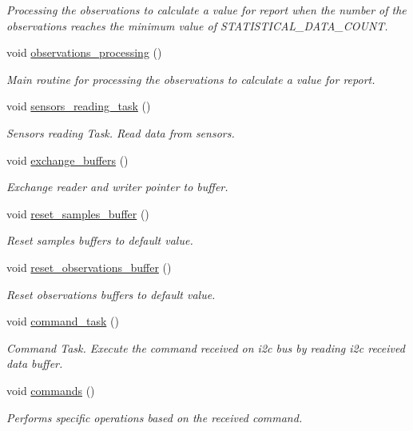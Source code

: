 \begin{DoxyCompactItemize}
\begin{DoxyCompactList}\small\item\em Processing the observations to calculate a value for report when the number of the observations reaches the minimum value of S\+T\+A\+T\+I\+S\+T\+I\+C\+A\+L\+\_\+\+D\+A\+T\+A\+\_\+\+C\+O\+U\+NT. \end{DoxyCompactList}\item 
void \hyperlink{i2c-th_8ino_a4c8e037e3b3f4c043abf3de8cf57fe68}{observations\+\_\+processing} ()
\begin{DoxyCompactList}\small\item\em Main routine for processing the observations to calculate a value for report. \end{DoxyCompactList}\item 
void \hyperlink{i2c-th_8ino_ad3efe51e17cb8205a24267c2992a12d4}{sensors\+\_\+reading\+\_\+task} ()
\begin{DoxyCompactList}\small\item\em Sensors reading Task. Read data from sensors. \end{DoxyCompactList}\item 
void \hyperlink{i2c-th_8ino_a46696a96b3118b5d8900703c054166c8}{exchange\+\_\+buffers} ()
\begin{DoxyCompactList}\small\item\em Exchange reader and writer pointer to buffer. \end{DoxyCompactList}\item 
void \hyperlink{i2c-th_8ino_ae176339df7451dc03037f319710575aa}{reset\+\_\+samples\+\_\+buffer} ()
\begin{DoxyCompactList}\small\item\em Reset samples buffers to default value. \end{DoxyCompactList}\item 
void \hyperlink{i2c-th_8ino_adfc6b4ac31f79cb1c99dd2409f05f32d}{reset\+\_\+observations\+\_\+buffer} ()
\begin{DoxyCompactList}\small\item\em Reset observations buffers to default value. \end{DoxyCompactList}\item 
void \hyperlink{i2c-th_8ino_a42389aceb96a84573eb67e6d141cb594}{command\+\_\+task} ()
\begin{DoxyCompactList}\small\item\em Command Task. Execute the command received on i2c bus by reading i2c received data buffer. \end{DoxyCompactList}\item 
void \hyperlink{i2c-th_8ino_a4981066e183f1432ffd6eddf55826585}{commands} ()
\begin{DoxyCompactList}\small\item\em Performs specific operations based on the received command. \end{DoxyCompactList}\end{DoxyCompactItemize}



